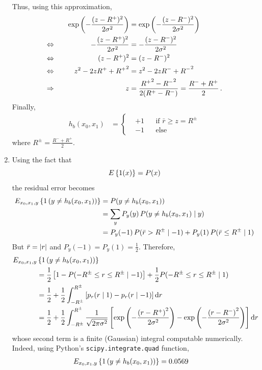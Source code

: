 \documentclass[a4paper, 12pt]{article}
\begin{document}
\begin{enumerate}[label = (\alph*)]
    	Thus, using this approximation,
    	\begin{alignat*}{2}
    	    && \exp\left(-\frac{(z - R^+)^2}{2 \sigma ^2}\right) & = \exp\left(-\frac{(z - R^-)^2}{2 \sigma ^2}\right) \\
    	    \Leftrightarrow \quad &&  -\frac{(z - R^+)^2}{2 \sigma ^2} & = -\frac{(z - R^-)^2}{2 \sigma ^2} \\
    	    \Leftrightarrow \quad &&  (z - R^+)^2 & = (z - R^-)^2 \\
    	    \Leftrightarrow \quad &&  z^2 - 2 z R^+ + {R^+}^2 & = z^2 - 2 z R^- + {R^-}^2 \\
    	    \Rightarrow \quad &&  z & = \frac{{R^+}^2 - {R^-}^2}{2 (R^+ - R^-)} = \frac{R^- + R^+}{2} \, .
    	\end{alignat*}
        Finally,
    	\begin{align}
    	    h_b(x_0, x_1) & = 
    	    \left\{
    	    \begin{aligned}
    	        & +1 && \text{if } \bar{r} \geq z = R^\pm \\
    	        & -1 && \text{else}
    	    \end{aligned}
    	    \right.
    	\end{align}
    	where $R^\pm = \frac{R^- + R^+}{2}$.

    	\item Using the fact that
    	$$E\left\{1(x)\right\} = P(x)$$
    	the residual error becomes
    	\begin{align*}
    	    E_{x_0, x_1, y}\left\{1\left(y \neq h_b(x_0, x_1)\right)\right\} & = P(y \neq h_b(x_0, x_1)) \\
    	    & = \sum_y P_y(y) \, P(y \neq h_b(x_0, x_1) \mid y) \\
    	    & = P_y(-1) \, P(\bar{r} >  R^\pm \mid -1) + P_y(1) \, P(\bar{r} \leq  R^\pm \mid 1)
    	\end{align*}
    	But $\bar{r} = \left|r\right|$ and $P_y(-1) = P_y(1) = \frac{1}{2}$. Therefore,
    	\begin{align}
    	    E_{x_0, x_1, y} & \left\{1\left(y \neq h_b(x_0, x_1)\right)\right\} \nonumber \\
    	    & = \frac{1}{2} \left[1 - P(-R^\pm \leq r \leq  R^\pm \mid -1)\right] + \frac{1}{2} P(-R^\pm \leq r \leq  R^\pm \mid 1) \nonumber \\
    	    & = \frac{1}{2} + \frac{1}{2} \int_{-R^\pm}^{R^\pm} \left[ p_r(r \mid 1) - p_r(r \mid -1) \right] \mathrm{d} r \nonumber \\
    	    & = \frac{1}{2} + \frac{1}{2} \int_{-R^\pm}^{R^\pm} \frac{1}{\sqrt{2 \pi \sigma^2}} \left[ \exp\left(-\frac{\left(r - R^+\right)^2}{2 \sigma ^2}\right) - \exp\left(-\frac{\left(r - R^-\right)^2}{2 \sigma ^2}\right)\right] \mathrm{d} r
    	\end{align}
    	whose second term is a finite (Gaussian) integral computable numerically. Indeed, using Python's \texttt{scipy.integrate.quad} function,
    	\begin{align}
    	    E_{x_0, x_1, y} \left\{1\left(y \neq h_b(x_0, x_1)\right)\right\} & = \num{0.0569}
    	\end{align}
	\end{enumerate}
	
\end{document}
